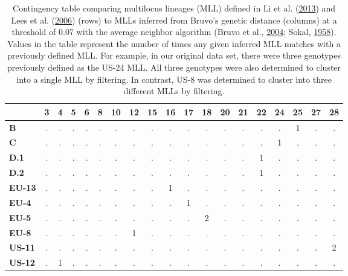\documentclass[double,11pt]{beavtex}
\begin{document}
  \begin{table}
  \centering
  \caption[Contingency table comparing multilocus lineages (MLL)]{Contingency table comparing multilocus lineages (MLL) defined in Li et
  al. (\protect\hyperlink{ref-li2013efficient}{2013}) and Lees et al.
  (\protect\hyperlink{ref-lees2006novel}{2006}) (rows) to MLLs inferred
  from Bruvo's genetic distance (columns) at a threshold of 0.07 with the
  average neighbor algorithm (Bruvo et al.,
  \protect\hyperlink{ref-bruvo2004simple}{2004}; Sokal,
  \protect\hyperlink{ref-sokal1958statistical}{1958}). Values in the table
  represent the number of times any given inferred MLL matches with a
  previously defined MLL. For example, in our original data set, there
  were three genotypes previously defined as the US-24 MLL. All three
  genotypes were also determined to cluster into a single MLL by
  filtering. In contrast, US-8 was determined to cluster into three
  different MLLs by filtering.} 
  \label{tab:pinftable}
  \begin{tabular}{l|cccccccccccccccccc}
    & \textbf{3} & \textbf{4} & \textbf{5} & \textbf{6} & \textbf{8} & \textbf{10} & \textbf{12} & \textbf{15} & \textbf{16} & \textbf{17} & \textbf{18} & \textbf{20} & \textbf{21} & \textbf{22} & \textbf{24} & \textbf{25} & \textbf{27} & \textbf{28} \\ 
    \midrule
  \textbf{B} & . & . & . & . & . & . & . & . & . & . & . & . & . & . & . & 1 & . & . \\ 
    \textbf{C} & . & . & . & . & . & . & . & . & . & . & . & . & . & . & 1 & . & . & . \\ 
    \textbf{D.1} & . & . & . & . & . & . & . & . & . & . & . & . & . & 1 & . & . & . & . \\ 
    \textbf{D.2} & . & . & . & . & . & . & . & . & . & . & . & . & . & 1 & . & . & . & . \\ 
    \textbf{EU-13} & . & . & . & . & . & . & . & . & 1 & . & . & . & . & . & . & . & . & . \\ 
    \textbf{EU-4} & . & . & . & . & . & . & . & . & . & 1 & . & . & . & . & . & . & . & . \\ 
    \textbf{EU-5} & . & . & . & . & . & . & . & . & . & . & 2 & . & . & . & . & . & . & . \\ 
    \textbf{EU-8} & . & . & . & . & . & . & 1 & . & . & . & . & . & . & . & . & . & . & . \\ 
    \textbf{US-11} & . & . & . & . & . & . & . & . & . & . & . & . & . & . & . & . & . & 2 \\ 
    \textbf{US-12} & . & 1 & . & . & . & . & . & . & . & . & . & . & . & . & . & . & . & . \\ 

\end{tabular}
\end{table}
\end{document}
